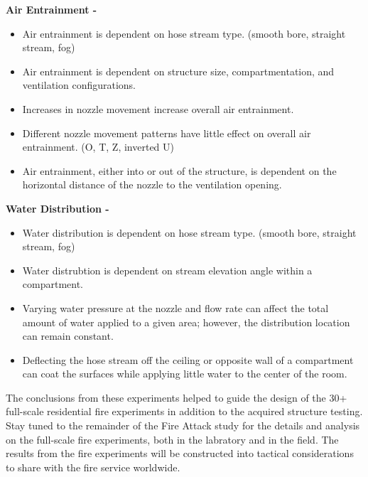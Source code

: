 \documentclass{article}
\begin{document}
\vspace*{\baselineskip}
\noindent \bf{Air Entrainment} -
\normalfont
\begin{itemize}
	\item Air entrainment is dependent on hose stream type. (smooth bore, straight stream, fog)
	\item Air entrainment is dependent on structure size, compartmentation, and ventilation configurations.
	\item Increases in nozzle movement increase overall air entrainment.
	\item Different nozzle movement patterns have little effect on overall air entrainment. (O, T, Z, inverted U)
	\item Air entrainment, either into or out of the structure, is dependent on the horizontal distance of the nozzle to the ventilation opening.
	\end{itemize}
\vspace*{\baselineskip}
\noindent \bf{Water Distribution} -
\normalfont
\begin{itemize}
	\item Water distribution is dependent on hose stream type. (smooth bore, straight stream, fog)
	\item Water distrubtion is dependent on stream elevation angle within a compartment.
	\item Varying water pressure at the nozzle and flow rate can affect the total amount of water applied to a given area; however, the distribution location can remain constant.
	\item Deflecting the hose stream off the ceiling or opposite wall of a compartment can coat the surfaces while applying little water to the center of the room.
	\end{itemize}
\vspace*{\baselineskip}

The conclusions from these experiments helped to guide the design of the 30+ full-scale residential fire experiments in addition to the acquired structure testing. Stay tuned to the remainder of the Fire Attack study for the details and analysis on the full-scale fire experiments, both in the labratory and in the field. The results from the fire experiments will be constructed into tactical considerations to share with the fire service worldwide.

\clearpage

\end{document}
